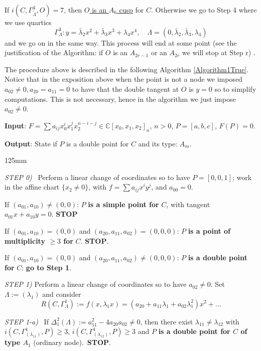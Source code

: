 \documentclass[draft]{amsart}
\theoremstyle{definition}
\theoremstyle{remark}
\theoremstyle{definition}
\def\a{\bigskip \par \noindent}
\def\b{\par \noindent}
\def\dd{\medskip \par \noindent}
\def\l{\lambda}
\begin{document}
\b If $i(C,\Gamma ^3_{\tilde \Lambda},O)= 7$, then \underline{$O$ is an $A_6$ cusp} for $C$. Otherwise we go to Step 4 where we use quartics $$\Gamma ^3_{\Lambda}: y= \bar \l_2x^2 + \bar \l_3x^3+ \l_4x^4, \quad  \Lambda = (0,\bar \l_2,\bar \l_3,\l_4)$$
 and we go on in the same way. This process will end at some point (see the justification of the Algorithm: if $O$ is an $A_{2r-1}$ or an $A_{2r}$ we will stop at Step r) .


\a  The procedure above is described in the following Algorithm \ref{Algorithm1True}. Notice that in the exposition above when the point is not a node we imposed $a_{02}\neq 0, a_{20}=a_{11}=0$ to have that the double tangent at $O$ is $y=0$ so to simplify computations.  This is not necessary, hence  in the algorithm we just impose $a_{02}\neq 0$. 


\begin{algorithm}[H]\caption{Study of the double points of a plane curve $C: \sum a_{ij}x_0^ix_1^jx_2^{n-i-j}=0$}\label{Algorithm1True}
\a  \textbf{Input}: $F =  \sum a_{ij}x_0^ix_1^jx_2^{n-i-j} \in \mathbb{C}[x_0,x_1,x_2]_n$, $n>0$, $P=[a,b,c]$, $F(P)=0$.\\
 \a \textbf{Output}: State if $P$ is a double point for $C$ and its type: $A_m$.

\a \begin{boxedminipage}{125mm}

    \begin{algorithmic}[1]

	\STATE\label{Alg1Step0} {\it STEP 0)} \  Perform a linear change of coordinates so to have $P = [0,0,1]$; work in the affine chart $\{x_2\neq 0\}$, with $f =  \sum a_{ij}x^iy^j$, and $a_{00}=0$.
	
	   \dd If $(a_{01},a_{10})\neq(0,0)$: $P$ {\bf is a simple point for} $C$, with tangent $a_{01}x+a_{10}y=0$. {\bf STOP}
	
	   \dd If $(a_{01},a_{10})=(0,0)$ and $(a_{20},a_{11},a_{02})=(0,0,0)$: $P$ {\bf is a point of multiplicity $\geq 3$ for} $C$. {\bf STOP}. 
	   
	   \dd If $(a_{01},a_{10})=(0,0)$ and $(a_{20},a_{11},a_{02})\neq (0,0,0)$: $P$ {\bf is a double point for} $C$: {\bf go to Step 1}.
	
	  \a  \STATE\label{Alg1Step1}{\it STEP 1)} Perform a linear change of coordinates so to have $a_{02}\neq 0$.
	 Set $\Lambda := (\l_1)$ and consider $$R(C,\Gamma^1_{\Lambda}) :=f(x, \l_1x)= (a_{20}+a_{11}\l_1+a_{02}\l_1^2)x^2 + \dots$$

	 \STATE\label{Alg1Step1a}{\it STEP 1-a)} \ If  $\Delta^2_1(\Lambda) := a_{11}^2-4a_{20}a_{02}\neq 0$, then there exist $\l_{11}\neq \l_{12}$ with $i(C,\Gamma^1_{(\l_{11})},P)\geq 3$, $i(C,\Gamma^1_{(\l_{12})},P)\geq 3$ and $P$ {\bf is a double point for $C$ of type $A_1$} (ordinary node).\ {\bf STOP}.
	

\end{algorithmic}
\end{boxedminipage}
\end{algorithm}
\end{document}
